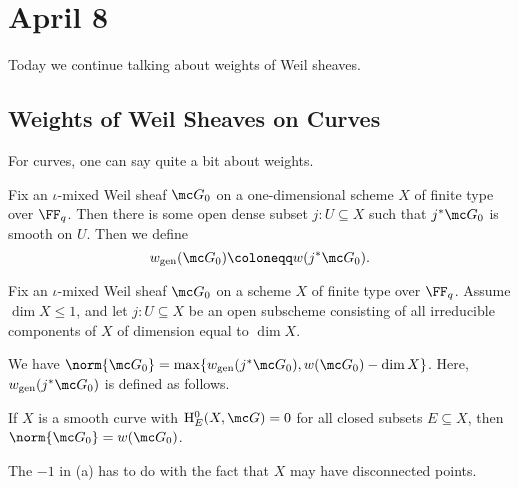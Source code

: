 \documentclass[../notes.tex]{subfiles}
\begin{document}
\section{April 8}
Today we continue talking about weights of Weil sheaves.

\subsection{Weights of Weil Sheaves on Curves}
For curves, one can say quite a bit about weights.
\begin{definition}
	Fix an $\iota$-mixed Weil sheaf $\mc G_0$ on a one-dimensional scheme $X$ of finite type over $\FF_q$. Then there is some open dense subset $j\colon U\subseteq X$ such that $j^*\mc G_0$ is smooth on $U$. Then we define
	\[w_{\mathrm{gen}}(\mc G_0)\coloneqq w(j^*\mc G_0).\]
\end{definition}
\begin{theorem}
	Fix an $\iota$-mixed Weil sheaf $\mc G_0$ on a scheme $X$ of finite type over $\FF_q$. Assume $\dim X\le1$, and let $j\colon U\subseteq X$ be an open subscheme consisting of all irreducible components of $X$ of dimension equal to $\dim X$.
	\begin{listalph}
		\item We have $\norm{\mc G_0}=\max\{w_{\mathrm{gen}}(j^*\mc G_0),w(\mc G_0)-\dim X\}$. Here, $w_{\mathrm{gen}}(j^*\mc G_0)$ is defined as follows.
		\item If $X$ is a smooth curve with $\mathrm H^0_E(X,\mc G)=0$ for all closed subsets $E\subseteq X$, then $\norm{\mc G_0}=w(\mc G_0)$.
	\end{listalph}
\end{theorem}
\begin{remark}
	The $-1$ in (a) has to do with the fact that $X$ may have disconnected points.
\end{remark}
\end{document}
